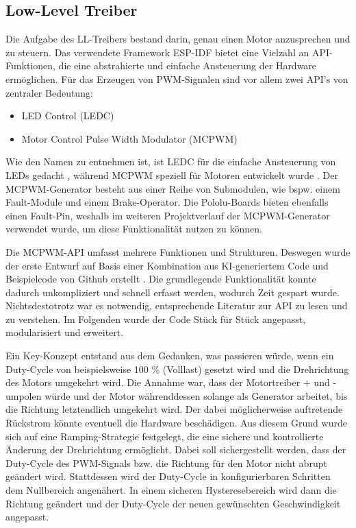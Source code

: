 \subsection{Low-Level Treiber}

Die Aufgabe des LL-Treibers bestand darin, genau einen Motor anzusprechen und zu steuern. Das verwendete Framework ESP-IDF bietet eine Vielzahl an API-Funktionen, die eine abstrahierte und einfache Ansteuerung der Hardware ermöglichen. Für das Erzeugen von PWM-Signalen sind vor allem zwei API's von zentraler Bedeutung:

\begin{itemize}
    \item LED Control (LEDC)
    \item Motor Control Pulse Width Modulator (MCPWM)
\end{itemize}

Wie den Namen zu entnehmen ist, ist LEDC für die einfache Ansteuerung von LEDs gedacht \cite{esp32_ledc}, während MCPWM speziell für Motoren entwickelt wurde \cite{esp32_mcpwm}. Der MCPWM-Generator besteht aus einer Reihe von Submodulen, wie bspw. einem Fault-Module und einem Brake-Operator. Die Pololu-Boards bieten ebenfalls einen Fault-Pin, weshalb im weiteren Projektverlauf der MCPWM-Generator verwendet wurde, um diese Funktionalität nutzen zu können. \newline

Die MCPWM-API umfasst mehrere Funktionen und Strukturen. Deswegen wurde der erste Entwurf auf Basis einer Kombination aus KI-generiertem Code und Beispielcode von Github erstellt \cite{esp32_mcpwm_example}. Die grundlegende Funktionalität konnte dadurch unkompliziert und schnell erfasst werden, wodurch Zeit gespart wurde. Nichtsdestotrotz war es notwendig, entsprechende Literatur zur API zu lesen und zu verstehen. Im Folgenden wurde der Code Stück für Stück angepasst, modularisiert und erweitert. \newline

Ein Key-Konzept entstand aus dem Gedanken, was passieren würde, wenn ein Duty-Cycle von beispielsweise 100 \% (Volllast) gesetzt wird und die Drehrichtung des Motors umgekehrt wird. Die Annahme war, dass der Motortreiber + und - umpolen würde und der Motor währenddessen solange als Generator arbeitet, bis die Richtung letztendlich umgekehrt wird. Der dabei möglicherweise auftretende Rückstrom könnte eventuell die Hardware beschädigen. Aus diesem Grund wurde sich auf eine Ramping-Strategie festgelegt, die eine sichere und kontrollierte Änderung der Drehrichtung ermöglicht. Dabei soll sichergestellt werden, dass der Duty-Cycle des PWM-Signals bzw. die Richtung für den Motor nicht abrupt geändert wird. Stattdessen wird der Duty-Cycle in konfigurierbaren Schritten dem Nullbereich angenähert. In einem sicheren Hysteresebereich wird dann die Richtung geändert und der Duty-Cycle der neuen gewünschten Geschwindigkeit angepasst. \newline

